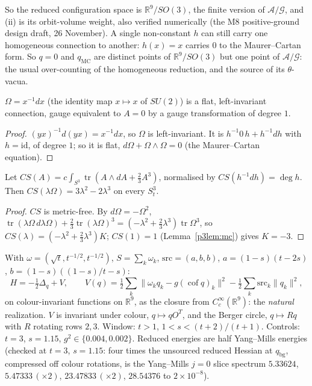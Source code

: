 So the reduced configuration space is $\mathbb R^9/SO(3)$, the finite version of $\mathcal A/\mathcal G$, and (ii) is its
orbit-volume weight, also verified numerically (the M8 positive-ground design draft, 26 November). A single non-constant $h$ can
still carry one homogeneous connection to another: $h(x)=x$ carries $0$ to the Maurer--Cartan form. So $q=0$ and
$q_{\mathrm{MC}}$ are distinct points of $\mathbb R^9/SO(3)$ but one point of $\mathcal A/\mathcal G$: the usual over-counting
of the homogeneous reduction, and the source of its $\theta$-vacua.

\begin{lemma}\label{p3lem:mc}
 $\Omega=x^{-1}dx$ (the identity map $x\mapsto x$ of $SU(2)$) is a flat, left-invariant connection,
gauge equivalent to $A=0$ by a gauge transformation of degree $1$.
\end{lemma}
\begin{proof}
$(yx)^{-1}d(yx)=x^{-1}dx$, so $\Omega$ is left-invariant. It is $h^{-1}0\,h+h^{-1}dh$ with $h=\mathrm{id}$, of degree $1$; so
it is flat, $d\Omega+\Omega\wedge\Omega=0$ (the Maurer--Cartan equation).
\end{proof}

\begin{theorem}\label{p3thm:cs}
 Let $CS(A)=c\int_{S^3}\operatorname{tr}(A\wedge dA+\tfrac23A^3)$, normalised by $CS(h^{-1}dh)=\deg h$.
Then $CS(\lambda\Omega)=3\lambda^2-2\lambda^3$ on every $S^3_t$.
\end{theorem}
\begin{proof}
$CS$ is metric-free. By $d\Omega=-\Omega^2$, $\operatorname{tr}(\lambda\Omega\,d\lambda\Omega)+\tfrac23\operatorname{tr}(\lambda\Omega)^3=(-\lambda^2+\tfrac23\lambda^3)\operatorname{tr}\Omega^3$,
so $CS(\lambda)=(-\lambda^2+\tfrac23\lambda^3)K$; $CS(1)=1$ (Lemma~\ref{p3lem:mc}) gives $K=-3$.
\end{proof}

\begin{definition}\label{p3def:model}
With $\omega=(\sqrt t,t^{-1/2},t^{-1/2})$, $S=\sum_k\omega_k$, $\mathrm{src}=(a,b,b)$, $a=(1-s)(t-2s)$,
$b=(1-s)((1-s)/t-s)$:
\[
 H=-\tfrac12\Delta_q+V,\qquad V(q)=\tfrac12\textstyle\sum_k\|\omega_kq_k-g(\operatorname{cof}q)_k\|^2-\tfrac12\sum_k\mathrm{src}_k\|q_k\|^2,
\]
on colour-invariant functions on $\mathbb R^9$, as the closure from $C_c^\infty(\mathbb R^9)$: the \emph{natural}
realization. $V$ is invariant under colour, $q\mapsto qO^T$, and the Berger circle, $q\mapsto Rq$ with $R$ rotating rows
$2,3$. Window: $t>1$, $1<s<(t+2)/(t+1)$. Controls: $t=3$, $s=1.15$, $g^2\in\{0.004,0.002\}$. Reduced energies are half
Yang--Mills energies (checked at $t=3$, $s=1.15$: four times the unsourced reduced Hessian at $q_{\mathrm{bg}}$, compressed off colour rotations, is the
Yang--Mills $j=0$ slice spectrum $5.33624$, $5.47333\,(\times2)$, $23.47833\,(\times2)$, $28.54376$ to $2\times10^{-8}$).
\end{definition}

